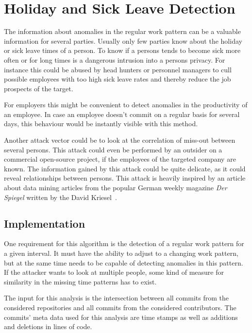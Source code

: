 \section{Holiday and Sick Leave Detection}

The information about anomalies in the regular work pattern can be a valuable information for several parties.
Usually only few parties know about the holiday or sick leave times of a person.
To know if a persons tends to become sick more often or for long times is a dangerous intrusion into a persons privacy.
For instance this could be abused by head hunters or personnel managers to cull possible employees with too high sick leave rates and thereby reduce the job prospects of the target.

For employers this might be convenient to detect anomalies in the productivity of an employee.
In case an employee doesn't commit on a regular basis for several days, this behaviour would be instantly visible with this method.

Another attack vector could be to look at the correlation of miss-out between several persons.
This attack could even be performed by an outsider on a commercial open-source project, if the employees of the targeted company are known.
The information gained by this attack could be quite delicate, as it could reveal relationships between persons.
This attack is heavily inspired by an article about data mining articles from the popular German weekly magazine \emph{Der Spiegel} written by the David Kriesel~\cite{article:spiegel-mining}.


\subsection{Implementation}

One requirement for this algorithm is the detection of a regular work pattern for a given interval.
It must have the ability to adjust to a changing work pattern, but at the same time needs to be capable of detecting anomalies in this pattern.
If the attacker wants to look at multiple people, some kind of measure for similarity in the missing time patterns has to exist.

The input for this analysis is the intersection between all commits from the considered repositories and all commits from the considered contributors.
The commits' meta data used for this analysis are time stamps as well as additions and deletions in lines of code.

